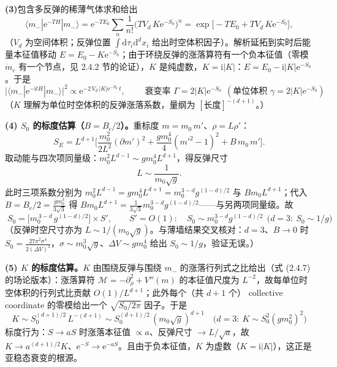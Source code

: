 \textbf{(3)}包含多反弹的稀薄气体求和给出
\begin{equation*}
\langle m_-|\mathrm{e}^{-TH}|m_-\rangle
=\mathrm{e}^{-TE_0}\sum_n\frac1{n!}\Big(TV_d\,K\mathrm{e}^{-S_0}\Big)^n
=\exp\Big[-TE_0+TV_d\,K\mathrm{e}^{-S_0}\Big],
\end{equation*}
（$V_d$ 为空间体积；反弹位置 $\int\mathrm{d}\tau_i\mathrm{d}^dx_i$ 给出时空体积因子）。解析延拓到实时后能量本征值移动 $E=E_0-K\mathrm{e}^{-S_0}$；由于环绕反弹的涨落算符有一个负本征值（零模 $\dot m_c$ 有一个节点，见 2.4.2 节的论证），$K$ 是纯虚数，$K=\mathrm{i}|K|$：$E=E_0-\mathrm{i}|K|\mathrm{e}^{-S_0}$。于是
\begin{equation*}
\big|\langle m_-|\mathrm{e}^{-\mathrm{i}tH}|m_-\rangle\big|^2\propto\mathrm{e}^{-2\,V_d\,|K|\mathrm{e}^{-S_0}\,t},
\qquad
\boxed{\;\text{衰变率 }\varGamma=2|K|\mathrm{e}^{-S_0}\ \ (\text{单位体积 }\gamma=2|K|\mathrm{e}^{-S_0})\;}
\end{equation*}
（$K$ 理解为单位时空体积的反弹涨落系数，量纲为 $[\text{长度}]^{-(d+1)}$。）

\textbf{(4) $S_0$ 的标度估算（$B=B_c/2$）。}重标度 $m=m_0\,m'$、$\rho=L\rho'$：
\begin{equation*}
S_E=L^{d+1}\Big[\frac{m_0^2}{2L^2}(\partial m')^2+\frac{gm_0^4}4(m'^2-1)^2+B\,m_0\,m'\Big].
\end{equation*}
取动能与四次项同量级：$m_0^2L^{d-1}\sim gm_0^4L^{d+1}$，得反弹尺寸
\begin{equation*}
L\sim\frac{1}{m_0\sqrt g}.
\end{equation*}
此时三项系数分别为 $m_0^2L^{d-1}=gm_0^4L^{d+1}=m_0^{3-d}g^{(1-d)/2}$ 与 $Bm_0L^{d+1}$；代入 $B=B_c/2=\frac{gm_0^3}{3\sqrt3}$ 得 $Bm_0L^{d+1}=\frac{1}{3\sqrt3}m_0^{3-d}g^{(1-d)/2}$——与另两项同量级。故
\begin{equation*}
\boxed{\;S_0=\Big[m_0^{\,3-d}\,g^{(1-d)/2}\Big]\times S',\qquad S'=O(1):\quad
S_0\sim m_0^{3-d}g^{(1-d)/2}\ \ \big(d=3:\ S_0\sim 1/g\big)\;}
\end{equation*}
（反弹时空尺寸亦为 $L\sim1/(m_0\sqrt g)$。与薄墙结果交叉核对：$d=3$、$B\to0$ 时 $S_0=\frac{27\pi^2\sigma^4}{2(\Delta V)^3}$，$\sigma\sim m_0^3\sqrt g$、$\Delta V\sim gm_0^4$ 给出 $S_0\sim1/g$，验证无误。）

\textbf{(5) $K$ 的标度估算。}$K$ 由围绕反弹与围绕 $m_-$ 的涨落行列式之比给出（式 (2.4.7) 的场论版本）：涨落算符 $\mathcal M=-\partial_\rho^2+V''(m)$ 的本征值尺度为 $L^{-2}$，故每单位时空体积的行列式比贡献 $O(1)/L^{d+1}$；此外每个（共 $d+1$ 个） collective coordinate 的零模给出一个 $\sqrt{S_0/2\pi}$ 因子。于是
\begin{equation*}
\boxed{\;K\sim S_0^{(d+1)/2}\,L^{-(d+1)}
\sim S_0^{(d+1)/2}\,(m_0\sqrt g)^{d+1}
\quad\big(d=3:\ K\sim S_0^2(gm_0^2)^2\big)\;}
\end{equation*}
标度行为：$S\to aS$ 时涨落本征值 $\propto a$、反弹尺寸 $\to L/\sqrt a$，故 $K\to a^{(d+1)/2}K$、$\mathrm{e}^{-S}\to\mathrm{e}^{-aS}$。且由于负本征值，$K$ 为虚数（$K=\mathrm{i}|K|$），这正是亚稳态衰变的根源。

